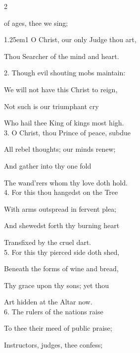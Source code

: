 \begin{paracol}{2}
\sloppy

\vspace{-0.5\baselineskip}

\firstEvensong
{}

\firstEvensongHymn
{} of ages, thee we sing;


\begin{hangparas}{1.25em}{1}
O Christ, our only Judge thou art,

Thou Searcher of the mind and heart.\\

\vspace{1\baselineskip}

2. Though evil shouting mobs maintain:

We will not have this Christ to reign,

Not such is our triumphant cry

Who hail thee King of kings most high.\\

3. O Christ, thou Prince of peace, subdue

All rebel thoughts; our minds renew;

And gather into thy one fold

The wand'rers whom thy love doth hold.\\

4. For this thou hangedst on the Tree

With arms outspread in fervent plea;

And shewedst forth thy burning heart

Transfixed by the cruel dart.\\

5. For this thy pierced side doth shed,

Beneath the forms of wine and bread,

Thy grace upon thy sons; yet thou

Art hidden at the Altar now.\\

6. The rulers of the nations raise

To thee their meed of public praise;

Instructors, judges, thee confess;


\end{hangparas}
\end{paracol}
